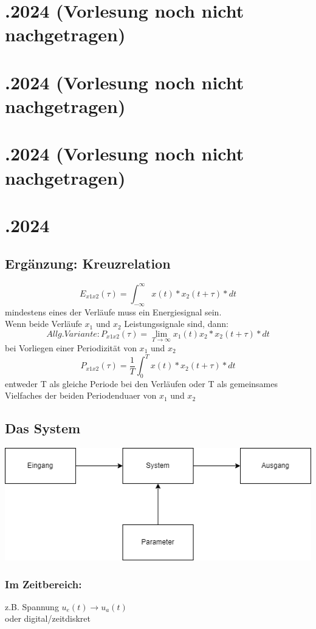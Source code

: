 \documentclass{article}
\begin{document}
\newpage
\section*{.2024 (Vorlesung noch nicht nachgetragen)}
\section*{.2024 (Vorlesung noch nicht nachgetragen)}
\section*{.2024 (Vorlesung noch nicht nachgetragen)}


\newpage
\section*{.2024}
\subsection*{Ergänzung: Kreuzrelation}

\[
	E_{x1x2}(\tau)=\int_{-\infty}^{\infty}x(t)*x_2(t+\tau)*dt 
\]
mindestens eines der Verläufe muss ein Energiesignal sein. \\
Wenn beide Verläufe $x_1$ und $x_2$ Leistungssignale sind, dann:
\[
	Allg. Variante: P_{x1x2}(\tau)=\lim_{T\to\infty}x_1(t)x_2*x_2(t+\tau)*dt
\]
bei Vorliegen einer Periodizität von $x_1$ und $x_2$
\[
	P_{x1x2}(\tau)=\frac{1}{T}\int_{0}^{T}x(t)*x_2(t+\tau)*dt
\]
entweder T als gleiche Periode bei den Verläufen oder T als gemeinsames Vielfaches der beiden Periodenduaer von $x_1$ und $x_2$

\subsection*{Das System}
\includegraphics[scale=0.8]{img/2024_11_11.png}

\subsubsection*{Im Zeitbereich:}
z.B. Spannung $u_e(t) \to u_a(t)$ \\
oder digital/zeitdiskret
\end{document}
